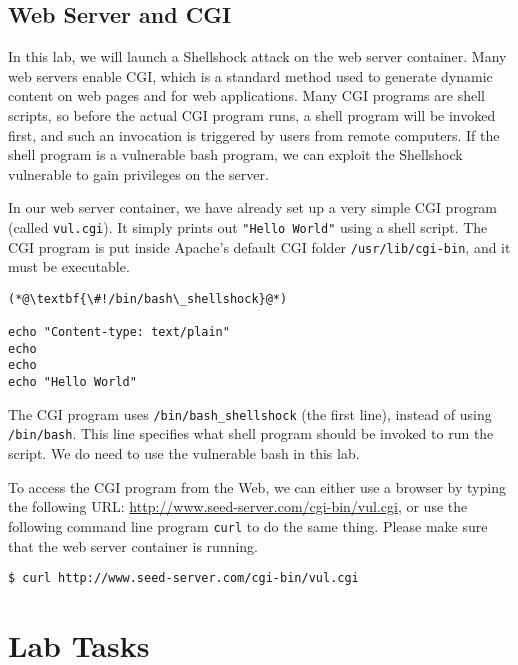\subsection{Web Server and CGI}

In this lab, we will launch a Shellshock attack on the web server container. 
Many web servers enable CGI, which is a standard method used to generate
dynamic content on web pages and for web applications. Many CGI programs are
shell scripts, so before the actual CGI program runs,
a shell program will be invoked first, and such an invocation is
triggered by users from remote computers. If the shell program is
a vulnerable bash program, we can exploit the Shellshock vulnerable to
gain privileges on the server.


In our web server container, we have already set up a very simple CGI
program (called \texttt{vul.cgi}). 
It simply prints out {\tt "Hello World"} using a shell script.
The CGI program is put inside Apache's default CGI folder \texttt{/usr/lib/cgi-bin},
and it must be executable. 

\begin{lstlisting}[caption=\texttt{vul.cgi}] 
(*@\textbf{\#!/bin/bash\_shellshock}@*)          

echo "Content-type: text/plain"
echo
echo
echo "Hello World"
\end{lstlisting}

The CGI program uses \texttt{/bin/bash\_shellshock} (the first line),
instead of using \texttt{/bin/bash}. This line specifies
what shell program should be invoked to run the script. We do need to use
the vulnerable bash in this lab.


To access the CGI program from the Web, we can either use a browser by
typing the following URL: \url{http://www.seed-server.com/cgi-bin/vul.cgi}, 
or use the following command line program {\tt curl} to do the same thing. Please 
make sure that the web server container is running.

\begin{lstlisting}
$ curl http://www.seed-server.com/cgi-bin/vul.cgi
\end{lstlisting}


\section{Lab Tasks}

